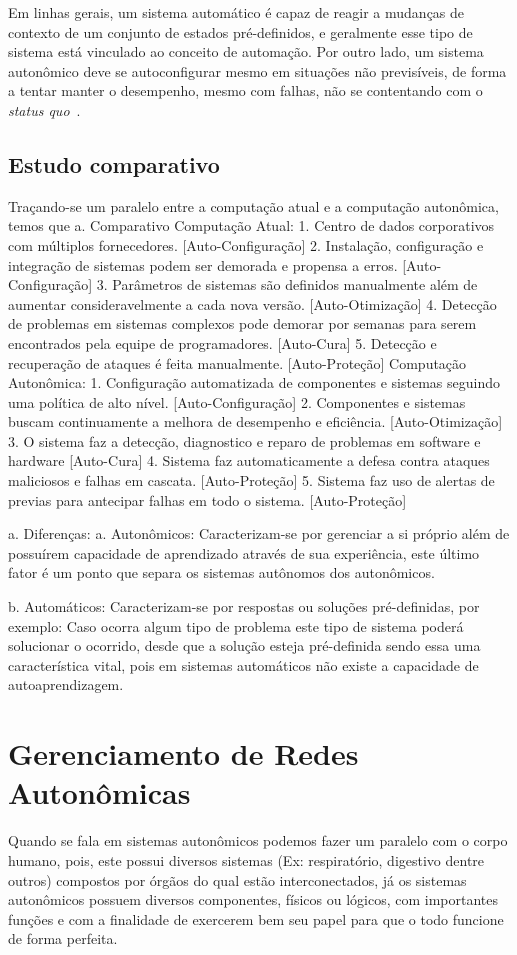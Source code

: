 \documentclass[11pt,twoside]{article}
\begin{document}
Em linhas gerais, um sistema automático é capaz de reagir a mudanças de contexto de um conjunto de estados pré-definidos, e geralmente esse tipo de sistema está vinculado ao conceito de automação. Por outro lado, um sistema autonômico deve se autoconfigurar mesmo em situações não previsíveis, de forma a tentar manter o desempenho, mesmo com falhas, não se contentando com o \textit{status quo}~\cite{GANEK}.



\subsection{Estudo comparativo}
Traçando-se um paralelo entre a computação atual e a computação autonômica, temos que
a.	Comparativo
Computação Atual:
1.	Centro de dados corporativos com múltiplos fornecedores. [Auto-Configuração]
2.	Instalação, configuração e integração de sistemas podem ser demorada e propensa a erros. [Auto-Configuração]
3.	Parâmetros de sistemas são definidos manualmente além de aumentar consideravelmente a cada nova versão. [Auto-Otimização]
4.	Detecção de problemas em sistemas complexos pode demorar por semanas para serem encontrados pela equipe de programadores. [Auto-Cura]
5.	Detecção e recuperação de ataques é feita manualmente. [Auto-Proteção]
Computação Autonômica:
1.	Configuração automatizada de componentes e sistemas seguindo uma política de alto nível. [Auto-Configuração]
2.	Componentes e sistemas buscam continuamente a melhora de desempenho e eficiência. [Auto-Otimização]
3.	O sistema faz a detecção, diagnostico e reparo de problemas em software e hardware [Auto-Cura]
4.	Sistema faz automaticamente a defesa contra ataques maliciosos e falhas em cascata. [Auto-Proteção]
5.	Sistema faz uso de alertas de previas para antecipar falhas em todo o sistema. [Auto-Proteção]

a.	Diferenças:
a.	Autonômicos: Caracterizam-se por gerenciar a si próprio além de possuírem capacidade de aprendizado através de sua experiência, este último fator é um ponto que separa os sistemas autônomos dos autonômicos.

b.	Automáticos: Caracterizam-se por respostas ou soluções pré-definidas, por exemplo: Caso ocorra algum tipo de problema este tipo de sistema poderá solucionar o ocorrido, desde que a solução esteja pré-definida sendo essa uma característica vital, pois em sistemas automáticos não existe a capacidade de autoaprendizagem.


\section{Gerenciamento de Redes Autonômicas}
Quando se fala em sistemas autonômicos podemos fazer um paralelo com o corpo humano, pois, este possui diversos sistemas (Ex: respiratório, digestivo dentre outros) compostos por órgãos do qual estão interconectados, já os sistemas autonômicos possuem diversos componentes, físicos ou lógicos, com importantes funções e com a finalidade de exercerem bem seu papel para que o todo funcione de forma perfeita.
\end{document}
